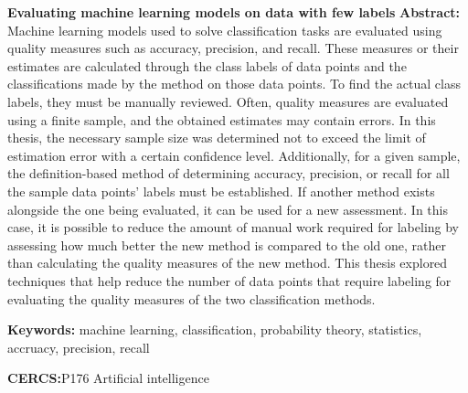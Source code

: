 \noindent\textbf{\large Evaluating machine learning models on data with few labels}
\vspace*{1ex}
\noindent\textbf{Abstract:}
\noindent
Machine learning models used to solve classification tasks are evaluated using quality measures such as accuracy, precision, and recall. These measures or their estimates are calculated through the class labels of data points and the classifications made by the method on those data points. To find the actual class labels, they must be manually reviewed. Often, quality measures are evaluated using a finite sample, and the obtained estimates may contain errors. In this thesis, the necessary sample size was determined not to exceed the limit of estimation error with a certain confidence level. Additionally, for a given sample, the definition-based method of determining accuracy, precision, or recall for all the sample data points' labels must be established. If another method exists alongside the one being evaluated, it can be used for a new assessment. In this case, it is possible to reduce the amount of manual work required for labeling by assessing how much better the new method is compared to the old one, rather than calculating the quality measures of the new method. This thesis explored techniques that help reduce the number of data points that require labeling for evaluating the quality measures of the two classification methods.
\vspace*{1ex}

\noindent\textbf{Keywords:} machine learning, classification, probability theory, statistics, accruacy, precision, recall
\vspace*{1ex}

\noindent\textbf{CERCS:}P176 Artificial intelligence
\vspace*{1ex}

